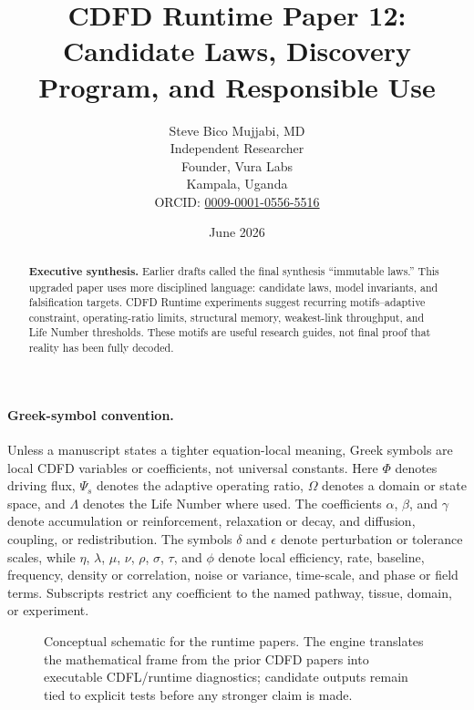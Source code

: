 \documentclass[12pt,a4paper]{article}
\title{\textbf{CDFD Runtime Paper 12: Candidate Laws, Discovery Program, and Responsible Use}}
\author{Steve Bico Mujjabi, MD\\
\small Independent Researcher\\
\small Founder, Vura Labs\\
\small Kampala, Uganda\\
\small ORCID: \href{https://orcid.org/0009-0001-0556-5516}{0009-0001-0556-5516}}
\date{June 2026}
\begin{document}
\maketitle

\begin{abstract}
\noindent \textbf{Executive synthesis.} Earlier drafts called the final synthesis
``immutable laws.'' This upgraded paper uses more disciplined language:
candidate laws, model invariants, and falsification targets. CDFD Runtime
experiments suggest recurring motifs--adaptive constraint, operating-ratio
limits, structural memory, weakest-link throughput, and Life Number thresholds.
These motifs are useful research guides, not final proof that reality has been
fully decoded.
\end{abstract}


\paragraph{Greek-symbol convention.}
Unless a manuscript states a tighter equation-local meaning, Greek symbols are local CDFD variables or coefficients, not universal constants. Here $\Phi$ denotes driving flux, $\Psi_s$ denotes the adaptive operating ratio, $\Omega$ denotes a domain or state space, and $\Lambda$ denotes the Life Number where used. The coefficients $\alpha$, $\beta$, and $\gamma$ denote accumulation or reinforcement, relaxation or decay, and diffusion, coupling, or redistribution. The symbols $\delta$ and $\epsilon$ denote perturbation or tolerance scales, while $\eta$, $\lambda$, $\mu$, $\nu$, $\rho$, $\sigma$, $\tau$, and $\phi$ denote local efficiency, rate, baseline, frequency, density or correlation, noise or variance, time-scale, and phase or field terms. Subscripts restrict any coefficient to the named pathway, tissue, domain, or experiment.

\begin{figure}[ht]
\centering
{}
\caption{Conceptual schematic for the runtime papers. The engine translates the mathematical frame from the prior CDFD papers into executable CDFL/runtime diagnostics; candidate outputs remain tied to explicit tests before any stronger claim is made.}
\end{figure}
\end{document}
